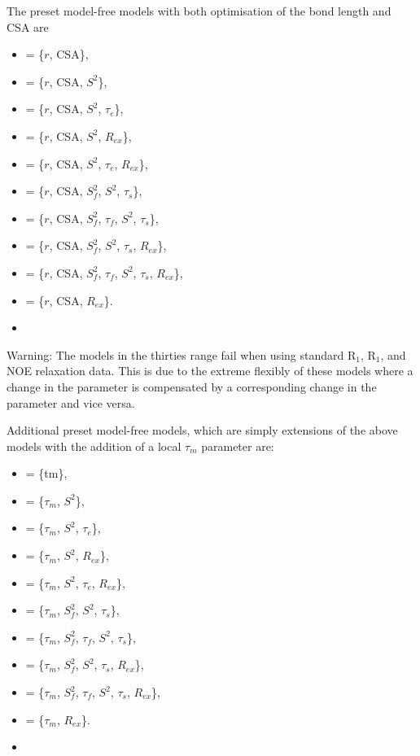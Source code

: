  The preset model-free models with both optimisation of the bond length and CSA are 
  

 \begin{itemize} 
 \item[]  = \{$r$, CSA\},  
 \item[]  = \{$r$, CSA, $S^2$\},  
 \item[]  = \{$r$, CSA, $S^2$, $\tau_e$\},  
 \item[]  = \{$r$, CSA, $S^2$, $R_{ex}$\},  
 \item[]  = \{$r$, CSA, $S^2$, $\tau_e$, $R_{ex}$\},  
 \item[]  = \{$r$, CSA, $S^2_f$, $S^2$, $\tau_s$\},  
 \item[]  = \{$r$, CSA, $S^2_f$, $\tau_f$, $S^2$, $\tau_s$\},  
 \item[]  = \{$r$, CSA, $S^2_f$, $S^2$, $\tau_s$, $R_{ex}$\},  
 \item[]  = \{$r$, CSA, $S^2_f$, $\tau_f$, $S^2$, $\tau_s$, $R_{ex}$\},  
 \item[]  = \{$r$, CSA, $R_{ex}$\}.  
 \item[]  
 \end{itemize} 
  

 Warning:  The models in the thirties range fail when using standard R$_1$, R$_1$, and NOE relaxation data.  This is due to the extreme flexibly of these models where a change in the parameter  is compensated by a corresponding change in the parameter  and vice versa. 
  

 Additional preset model-free models, which are simply extensions of the above models with the addition of a local $\tau_m$ parameter are: 
  

 \begin{itemize} 
 \item[]  = \{tm\},  
 \item[]  = \{$\tau_m$, $S^2$\},  
 \item[]  = \{$\tau_m$, $S^2$, $\tau_e$\},  
 \item[]  = \{$\tau_m$, $S^2$, $R_{ex}$\},  
 \item[]  = \{$\tau_m$, $S^2$, $\tau_e$, $R_{ex}$\},  
 \item[]  = \{$\tau_m$, $S^2_f$, $S^2$, $\tau_s$\},  
 \item[]  = \{$\tau_m$, $S^2_f$, $\tau_f$, $S^2$, $\tau_s$\},  
 \item[]  = \{$\tau_m$, $S^2_f$, $S^2$, $\tau_s$, $R_{ex}$\},  
 \item[]  = \{$\tau_m$, $S^2_f$, $\tau_f$, $S^2$, $\tau_s$, $R_{ex}$\},  
 \item[]  = \{$\tau_m$, $R_{ex}$\}.  
 \item[]  
 \end{itemize} 
  


